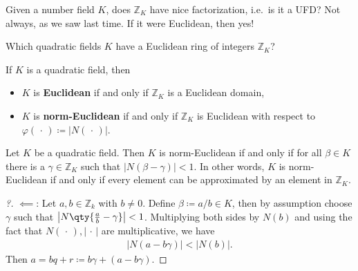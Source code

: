 \begin{remark}

Given a number field \(K\), does \({\mathbb{Z}}_K\) have nice
factorization, i.e.~is it a UFD? Not always, as we saw last time. If it
were Euclidean, then yes!

\end{remark}

\begin{question}

Which quadratic fields \(K\) have a Euclidean ring of integers
\({\mathbb{Z}}_K\)?

\end{question}

\begin{definition}

If \(K\) is a quadratic field, then

\begin{itemize}
\item
  \(K\) is \textbf{Euclidean} if and only if \({\mathbb{Z}}_K\) is a
  Euclidean domain,
\item
  \(K\) is \textbf{norm-Euclidean} if and only if \({\mathbb{Z}}_K\) is
  Euclidean with respect to
  \(\varphi({\,\cdot\,}) \coloneqq{\left\lvert {N({\,\cdot\,})} \right\rvert}\).
\end{itemize}

\end{definition}

\begin{proposition}

Let \(K\) be a quadratic field. Then \(K\) is norm-Euclidean if and only
if for all \(\beta\in K\) there is a \(\gamma\in {\mathbb{Z}}_K\) such
that \({\left\lvert { N(\beta- \gamma) } \right\rvert} < 1\). In other
words, \(K\) is norm-Euclidean if and only if every element can be
approximated by an element in \({\mathbb{Z}}_K\).

\end{proposition}

\begin{proof}[?]

\(\impliedby\): Let \(a,b \in {\mathbb{Z}}_k\) with \(b\neq 0\). Define
\(\beta\coloneqq a/b \in K\), then by assumption choose \(\gamma\) such
that \({\left\lvert {N \qty{ {a\over b} - \gamma} } \right\rvert}< 1\).
Multiplying both sides by \(N(b)\) and using the fact that
\(N({\,\cdot\,}), {\left\lvert {{\,\cdot\,}} \right\rvert}\) are
multiplicative, we have
\begin{align*}
{\left\lvert {N(a - b \gamma)} \right\rvert} < {\left\lvert {N(b)} \right\rvert} 
.\end{align*}
Then \(a = bq + r \coloneqq b \gamma + (a - b \gamma)\).

\end{proof}

